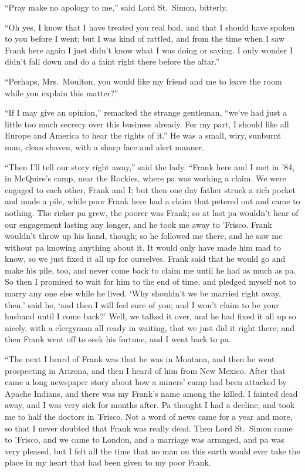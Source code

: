 “Pray make no apology to me,” said Lord St.~Simon, bitterly.

“Oh yes, I know that I have treated you real bad, and that
I should have spoken to you before I went; but I was kind of
rattled, and from the time when I saw Frank here again I
just didn’t know what I was doing or saying. I only wonder
I didn’t fall down and do a faint right there before the
altar.”

“Perhaps, Mrs.~Moulton, you would like my friend and me
to leave the room while you explain this matter?”

“If I may give an opinion,” remarked the strange gentleman,
“we’ve had just a little too much secrecy over this business
already. For my part, I should like all Europe and
America to hear the rights of it.” He was a small, wiry,
sunburnt man, clean shaven, with a sharp face and alert
manner.

“Then I’ll tell our story right away,” said the lady. “Frank
here and I met in ’84, in McQuire’s camp, near the Rockies,
where pa was working a claim. We were engaged to each
other, Frank and I; but then one day father struck a rich
pocket and made a pile, while poor Frank here had a claim
that petered out and came to nothing. The richer pa grew,
the poorer was Frank; so at last pa wouldn’t hear of our engagement
lasting any longer, and he took me away to ’Frisco.
Frank wouldn’t throw up his hand, though; so he followed
me there, and he saw me without pa knowing anything about
it. It would only have made him mad to know, so we just
fixed it all up for ourselves. Frank said that he would go
and make his pile, too, and never come back to claim me
until he had as much as pa. So then I promised to
wait for him to the end of time, and pledged myself not to
marry any one else while he lived. ‘Why shouldn’t we be
married right away, then,’ said he, ‘and then I will feel sure
of you; and I won’t claim to be your husband until I come
back?’ Well, we talked it over, and he had fixed it all up so
nicely, with a clergyman all ready in waiting, that we just did
it right there; and then Frank went off to seek his fortune,
and I went back to pa.

“The next I heard of Frank was that he was in Montana,
and then he went prospecting in Arizona, and then I heard of
him from New Mexico. After that came a long newspaper
story about how a miners’ camp had been attacked by Apache
Indians, and there was my Frank’s name among the killed.
I fainted dead away, and I was very sick for months after.
Pa thought I had a decline, and took me to half the doctors
in ’Frisco. Not a word of news came for a year and more, so
that I never doubted that Frank was really dead. Then
Lord St.~Simon came to ’Frisco, and we came to London, and
a marriage was arranged, and pa was very pleased, but I felt
all the time that no man on this earth would ever take the
place in my heart that had been given to my poor Frank.


